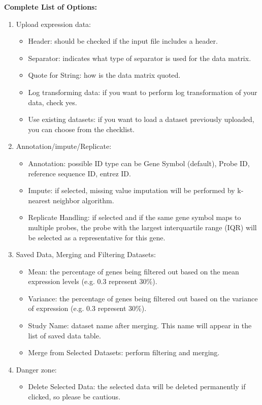 \textbf{Complete List of Options:} 
\begin{enumerate}
\item Upload expression data:
\begin{itemize}
\item Header: should be checked if the input file includes a header.
\item Separator: indicates what type of separator is used for the data matrix.
\item Quote for String: how is the data matrix quoted.
\item Log transforming data: if you want to perform log transformation of your data, check yes.
\item Use existing datasets: if you want to load a dataset previously uploaded, you can choose from the checklist.
\end{itemize}
\item Annotation/impute/Replicate:
\begin{itemize}
\item Annotation: possible ID type can be Gene Symbol (default), Probe ID, reference sequence ID, entrez ID.
\item Impute: if selected, missing value imputation will be performed by k-nearest neighbor algorithm.
\item Replicate Handling: if selected and if the same gene symbol maps to multiple probes, the probe with the largest interquartile range (IQR) will be selected
as a representative for this gene.
\end{itemize}
\item Saved Data, Merging and Filtering Datasets:
\begin{itemize}
\item Mean: the percentage of genes being filtered out based on the mean expression levels (e.g. 0.3 represent 30\%).
\item Variance: the percentage of genes being filtered out based on the variance of expression (e.g. 0.3 represent 30\%).
\item Study Name: dataset name after merging. This name will appear in the list of saved data table.
\item Merge from Selected Datasets: perform filtering and merging.
\end{itemize}
\item Danger zone:
\begin{itemize}
\item Delete Selected Data: the selected data will be deleted permanently if clicked, so please be cautious.
\end{itemize}

\end{enumerate}



